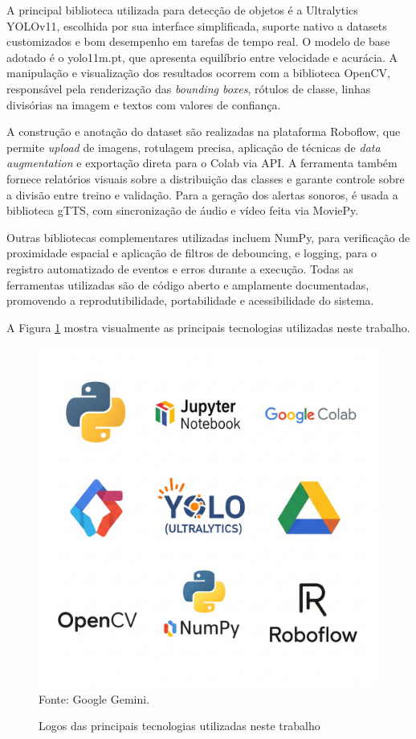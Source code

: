 A principal biblioteca utilizada para detecção de objetos é a Ultralytics YOLOv11, escolhida por sua interface simplificada, suporte nativo a datasets customizados e bom desempenho em tarefas de tempo real. O modelo de base adotado é o yolo11m.pt, que apresenta equilíbrio entre velocidade e acurácia. A manipulação e visualização dos resultados ocorrem com a biblioteca OpenCV, responsável pela renderização das \textit{bounding boxes}, rótulos de classe, linhas divisórias na imagem e textos com valores de confiança.

A construção e anotação do dataset são realizadas na plataforma Roboflow, que permite \textit{upload} de imagens, rotulagem precisa, aplicação de técnicas de \textit{data augmentation} e exportação direta para o Colab via API. A ferramenta também fornece relatórios visuais sobre a distribuição das classes e garante controle sobre a divisão entre treino e validação. Para a geração dos alertas sonoros, é usada a biblioteca gTTS, com sincronização de áudio e vídeo feita via MoviePy.

Outras bibliotecas complementares utilizadas incluem NumPy, para verificação de proximidade espacial e aplicação de filtros de debouncing, e logging, para o registro automatizado de eventos e erros durante a execução. Todas as ferramentas utilizadas são de código aberto e amplamente documentadas, promovendo a reprodutibilidade, portabilidade e acessibilidade do sistema.

A Figura \ref{fg-tecnologias-logos} mostra visualmente as principais tecnologias utilizadas neste trabalho.
\begin{figure}[htbp]
  \centering
  \caption{Logos das principais tecnologias utilizadas neste trabalho}
  \includegraphics[width=0.6 \textwidth]{Figuras/tecnologias_logos.png}
  \\
  Fonte: Google Gemini.
  \label{fg-tecnologias-logos}
\end{figure}

